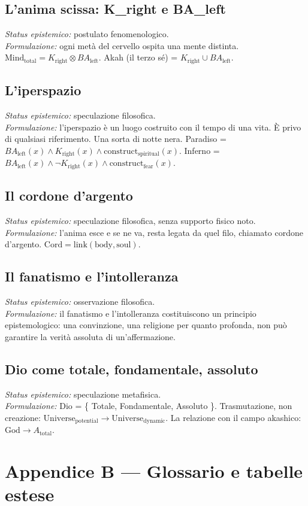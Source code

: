 \subsection{L'anima scissa: K\_right e BA\_left}
\textit{Status epistemico:} postulato fenomenologico. \\
\textit{Formulazione:} ogni metà del cervello ospita una mente distinta. $\text{Mind}_{\text{total}} = K_{\text{right}} \otimes BA_{\text{left}}$. Akah (il terzo sé) = $K_{\text{right}} \cup BA_{\text{left}}$.

\subsection{L'iperspazio}
\textit{Status epistemico:} speculazione filosofica. \\
\textit{Formulazione:} l'iperspazio è un luogo costruito con il tempo di una vita. È privo di qualsiasi riferimento. Una sorta di notte nera. Paradiso = $BA_{\text{left}}(x) \land K_{\text{right}}(x) \land \text{construct}_{\text{spiritual}}(x)$. Inferno = $BA_{\text{left}}(x) \land \neg K_{\text{right}}(x) \land \text{construct}_{\text{fear}}(x)$.

\subsection{Il cordone d'argento}
\textit{Status epistemico:} speculazione filosofica, senza supporto fisico noto. \\
\textit{Formulazione:} l'anima esce e se ne va, resta legata da quel filo, chiamato cordone d'argento. $\text{Cord} = \text{link}(\text{body}, \text{soul})$.

\subsection{Il fanatismo e l'intolleranza}
\textit{Status epistemico:} osservazione filosofica. \\
\textit{Formulazione:} il fanatismo e l'intolleranza costituiscono un principio epistemologico: una convinzione, una religione per quanto profonda, non può garantire la verità assoluta di un'affermazione.

\subsection{Dio come totale, fondamentale, assoluto}
\textit{Status epistemico:} speculazione metafisica. \\
\textit{Formulazione:} Dio = \{ Totale, Fondamentale, Assoluto \}. Trasmutazione, non creazione: $\text{Universe}_{\text{potential}} \to \text{Universe}_{\text{dynamic}}$. La relazione con il campo akashico: $\text{God} \to A_{\text{total}}$.

\section{Appendice B --- Glossario e tabelle estese}
